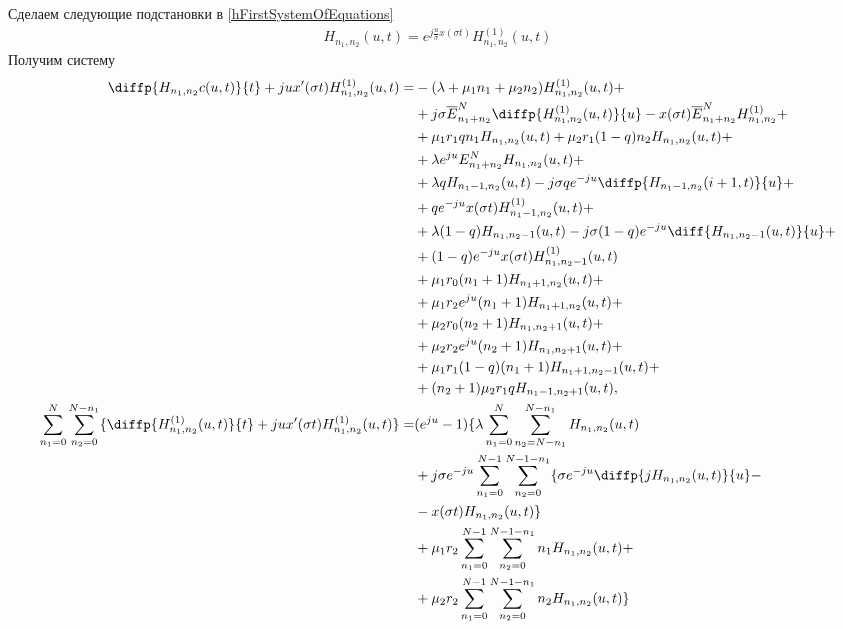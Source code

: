 Сделаем следующие подстановки в \eqref{hFirstSystemOfEquations}
\begin{align*}
H_{n_{1}, n_{2}}(u,t)=e^{j\frac{u}{\sigma}x(\sigma t)}H_{n_{1}, n_{2}}^{(1)}(u,t)
\end{align*}
Получим систему
\begin{equation}
	\begin{split}
		\diffp{H_{n_{1}, n_{2}}c(u,t)}{t}+jux'(\sigma t)H_{n_{1}, n_{2}}^{(1)}(u,t)=
		&-(\lambda+\mu_{1}n_{1}+\mu_{2}n_{2})H_{n_{1}, n_{2}}^{(1)}(u,t) +\\
		&+ j\sigma \overline{E}_{n_{1}+n_{2}}^N\diffp{H_{n_{1}, n_{2}}^{(1)}(u,t)}{u}-x(\sigma t)\overline{E}_{n_{1}+n_{2}}^NH_{n_{1}, n_{2}}^{(1)}+\\
		&+\mu_{1}r_{1}q n_{1}H_{n_{1}, n_{2}}(u,t)+ \mu_{2}r_{1}(1-q)n_{2}H_{n_{1}, n_{2}}(u,t)+\\
		&+ \lambda e^{ju} E_{n_{1}+n_{2}}^N H_{n_{1}, n_{2}}(u,t)+\\
		&+\lambda qH_{n_{1}-1, n_{2}}(u,t) - j \sigma q  e^{-ju} \diffp{H_{n_{1}-1, n_{2}}(i+1,t)}{u}+\\
		&+ q  e^{-ju} x(\sigma t)H_{n_{1}-1, n_{2}}^{(1)}(u,t)+\\
		&+\lambda (1-q)H_{n_{1}, n_{2}-1}(u,t) - j \sigma (1-q) e^{-ju} \diff{H_{n_{1}, n_{2}-1}(u,t)}{u}+\\
		&+ (1-q) e^{-ju} x(\sigma t) H_{n_{1}, n_{2}-1}^{(1)}(u,t)\\
		&+ \mu_{1} r_{0}(n_{1}+1) H_{n_{1} +1 , n_{2}}(u,t)+\\
		& + \mu_{1} r_{2}  e^{ju}(n_{1}+1)H_{n_{1} + 1, n_{2}}(u,t)+\\
		&+ \mu_{2} r_{0}(n_{2}+1) H_{n_{1}, n_{2} + 1 }(u,t)+\\
		& + \mu_{2} r_{2}  e^{ju}(n_{2}+1) H_{n_{1}, n_{2} + 1}(u,t)+\\
		&+\mu_{1} r_{1}(1-q)(n_{1}+1) H_{n_{1} +1 , n_{2}-1}(u,t)+\\
		&+(n_{2}+1)\mu_{2} r_{1}q H_{n_{1} -1 , n_{2}+1}(u,t) ,\\
		\sum_{n_1=0}^N\sum_{n_2=0}^{N-n_1}\{ \diffp{H_{n_1,n_2}^{(1)}(u,t)}{t}+ju x'(\sigma t)H_{n_1,n_2}^{(1)}(u,t)\}=
		&(e^{ju} - 1)\{\lambda \sum_{n_1=0}^N\sum_{n_2=N-n_1}^{N-n_1} 
		H_{n_1, n_2}(u,t)\\
		&+ j \sigma e^{-ju}\sum_{n_1=0}^{N-1}\sum_{n_2=0}^{N-1-n_1} 
		\{\sigma e^{-ju}\diffp{j H_{n_1, n_2}(u,t)}{u}-\\
		&-x(\sigma t)H_{n_1, n_2}(u,t)\}\\
		&+\mu_1 r_2 \sum_{n_1=0}^{N-1}\sum_{n_2=0}^{N-1-n_1} 
		n_1 H_{n_1, n_2}(u,t)+\\
		&+\mu_2 r_2 \sum_{n_1=0}^{N-1}\sum_{n_2=0}^{N-1-n_1} 
		n_2 H_{n_1, n_2}(u,t)\}\
	\end{split}
\end{equation}
